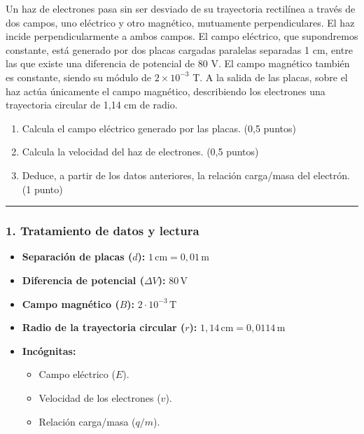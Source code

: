 \begin{cajaenunciado}
Un haz de electrones pasa sin ser desviado de su trayectoria rectilínea a través de dos campos, uno eléctrico y otro magnético, mutuamente perpendiculares. El haz incide perpendicularmente a ambos campos. El campo eléctrico, que supondremos constante, está generado por dos placas cargadas paralelas separadas 1 cm, entre las que existe una diferencia de potencial de 80 V. El campo magnético también es constante, siendo su módulo de $2\times10^{-3}$ T. A la salida de las placas, sobre el haz actúa únicamente el campo magnético, describiendo los electrones una trayectoria circular de 1,14 cm de radio. 
\begin{enumerate}
    \item Calcula el campo eléctrico generado por las placas. (0,5 puntos) 
    \item Calcula la velocidad del haz de electrones. (0,5 puntos) 
    \item Deduce, a partir de los datos anteriores, la relación carga/masa del electrón. (1 punto) 
\end{enumerate}
\end{cajaenunciado}
\hrule

\subsubsection*{1. Tratamiento de datos y lectura}
\begin{itemize}
    \item \textbf{Separación de placas ($d$):} $1 \, \text{cm} = 0,01 \, \text{m}$
    \item \textbf{Diferencia de potencial ($\Delta V$):} $80 \, \text{V}$
    \item \textbf{Campo magnético ($B$):} $2 \cdot 10^{-3} \, \text{T}$
    \item \textbf{Radio de la trayectoria circular ($r$):} $1,14 \, \text{cm} = 0,0114 \, \text{m}$
    \item \textbf{Incógnitas:}
        \begin{itemize}
            \item Campo eléctrico ($E$).
            \item Velocidad de los electrones ($v$).
            \item Relación carga/masa ($q/m$).
        \end{itemize}
\end{itemize}

